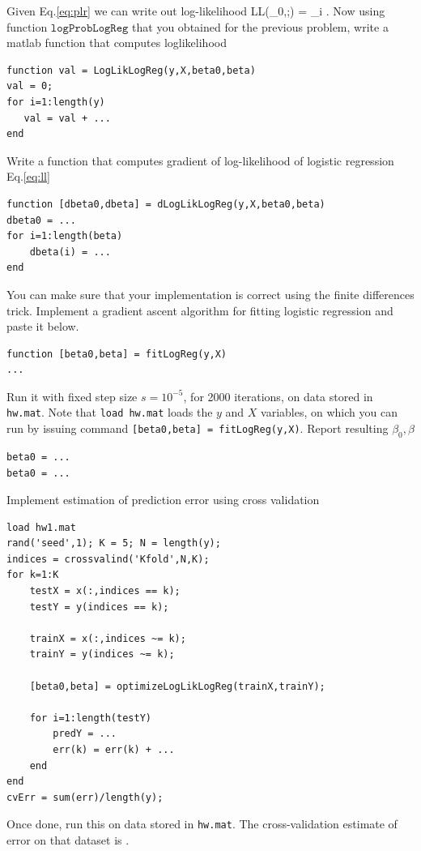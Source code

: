 \documentclass{article}
\begin{document}
\newproblem{1pt}
Given Eq.\eqref{eq:plr} we can write out log-likelihood
\BEQ \label{eq:ll}
\textrm{LL}(\beta_0,\beta;) = \sum_i \log {}.
\EEQ
Now using function $\texttt{logProbLogReg}$ that you obtained for the previous problem, write a matlab function that computes loglikelihood
\begin{verbatim}
function val = LogLikLogReg(y,X,beta0,beta)
val = 0;
for i=1:length(y)
   val = val + ...
end
\end{verbatim}
\newproblem{1pt}
Write a function that computes gradient of log-likelihood of logistic regression Eq.\eqref{eq:ll}
\begin{verbatim}
function [dbeta0,dbeta] = dLogLikLogReg(y,X,beta0,beta)
dbeta0 = ...
for i=1:length(beta)
    dbeta(i) = ...
end
\end{verbatim}
You can make sure that your implementation is correct using the finite differences trick.
\newproblem{1pt}
Implement a gradient ascent algorithm for fitting logistic regression and paste it below.
\begin{verbatim}
function [beta0,beta] = fitLogReg(y,X)
...
\end{verbatim}
Run it with fixed step size $s=10^{-5}$, for 2000 iterations, on data stored in \texttt{hw\theHW.mat}.
Note that \texttt{load hw\theHW.mat} loads the $y$ and $X$ variables, on which you can run by issuing command
\texttt{[beta0,beta] = fitLogReg(y,X)}.
Report resulting $\beta_0,\beta$
\begin{verbatim}
beta0 = ...
beta0 = ...
\end{verbatim}
\newproblem{1pt}
Implement estimation of prediction error using cross validation
\begin{verbatim}
load hw1.mat
rand('seed',1); K = 5; N = length(y);
indices = crossvalind('Kfold',N,K);
for k=1:K
    testX = x(:,indices == k);
    testY = y(indices == k);

    trainX = x(:,indices ~= k);
    trainY = y(indices ~= k);

    [beta0,beta] = optimizeLogLikLogReg(trainX,trainY);

    for i=1:length(testY)
        predY = ...
        err(k) = err(k) + ...
    end
end
cvErr = sum(err)/length(y);
\end{verbatim}
Once done, run this on data stored in \texttt{hw\theHW.mat}. The cross-validation estimate of error on that dataset is \answer.
\end{document}
